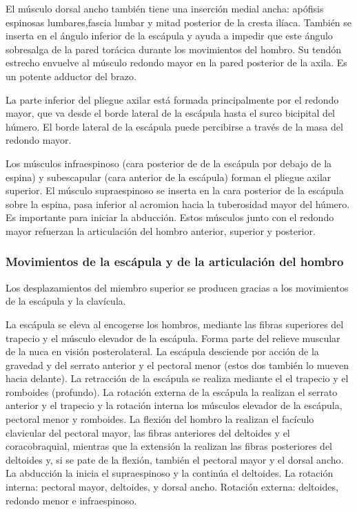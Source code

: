 \documentclass[a4paper,12pt]{article} %
\begin{document}
\begin{appendices}
El músculo dorsal ancho también tiene una inserción medial ancha: apófisis espinosas lumbares,fascia lumbar y mitad posterior de la cresta ilíaca. También se inserta en el ángulo inferior de la escápula y ayuda a impedir que este ángulo sobresalga de la pared torácica durante los movimientos del hombro. Su tendón estrecho envuelve al músculo redondo mayor en la pared posterior de la axila. Es un potente adductor del brazo.

La parte inferior del pliegue axilar está formada principalmente por el redondo mayor, que va desde el borde lateral de la escápula hasta el surco bicipital del húmero. El borde lateral de la escápula puede percibirse a través de la masa del redondo mayor.

Los músculos infraespinoso (cara posterior de de la escápula por debajo de la espina) y subescapular (cara anterior de la escápula) forman el pliegue axilar superior. El músculo supraespinoso se inserta en la cara posterior de la escápula sobre la espina, pasa inferior al acromion hacia la tuberosidad mayor del húmero. Es importante para iniciar la abducción. Estos músculos junto con el redondo mayor refuerzan la articulación del hombro anterior, superior y posterior.

\subsubsection{Movimientos de la escápula y de la articulación del hombro}
Los desplazamientos del miembro superior se producen gracias a los movimientos de la escápula y la clavícula.

La escápula se eleva al encogerse los hombros, mediante las fibras superiores del trapecio y el músculo elevador de la escápula. Forma parte del relieve muscular de la nuca en visión posterolateral. La escápula desciende por acción de la gravedad y del serrato anterior y el pectoral menor (estos dos también lo mueven hacia delante). La retracción de la escápula se realiza mediante el el trapecio y el romboides (profundo). La rotación externa de la escápula la realizan el serrato anterior y el trapecio y la rotación interna los músculos elevador de la escápula, pectoral menor y romboides. La flexión del hombro la realizan el facículo clavicular del pectoral mayor, las fibras anteriores del deltoides y el coracobraquial, mientras que la extensión la realizan las fibras posteriores del deltoides y, si se pate de la flexión, también el pectoral mayor y el dorsal ancho. La abducción la inicia el supraespinoso y la continúa el deltoides. La rotación interna: pectoral mayor, deltoides, y dorsal ancho. Rotación externa: deltoides, redondo menor e infraespinoso.


\end{appendices}
\end{document}
